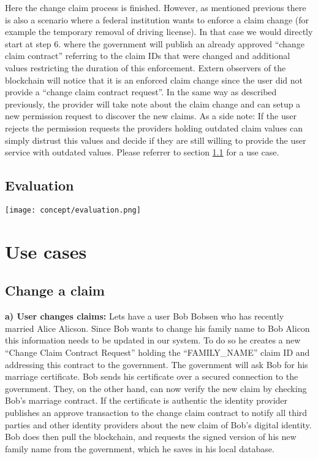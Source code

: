 Here the change claim process is finished. However, as mentioned previous there is also a scenario where a federal institution wants to enforce a claim change (for example the temporary removal of driving license). In that case we would directly start at step 6. where the government will publish an already approved “change claim contract” referring to the claim IDs that were changed and additional values restricting the duration of this enforcement. Extern observers of the blockchain will notice that it is an enforced claim change since the user did not provide a “change claim contract request”. In the same way as described previously, the provider will take note about the claim change and can setup a new permission request to discover the new claims. As a side note: If the user rejects the permission requests the providers holding outdated claim values can simply distrust this values and decide if they are still  willing to provide the user service with outdated values. Please referrer to section \ref{sec:changeClaimUseCase} for a use case.

\subsection{Evaluation}

 \texttt{[image: concept/evaluation.png]}
 
\section{Use cases}

\subsection{Change a claim}
\label{sec:changeClaimUseCase}
\textbf{a) User changes claims:}
Lets have a user Bob Bobsen who has recently married Alice Alicson. Since Bob wants to change his family name to Bob Alicon this information needs to be updated in our system. To do so he creates a new “Change Claim Contract Request” holding the “FAMILY\_NAME” claim ID and addressing this contract to the government. The government will ask Bob for his marriage certificate. Bob sends his certificate over a secured connection to the government. They, on the other hand, can now verify the new claim by checking Bob's marriage contract. If the certificate is authentic the identity provider publishes an approve transaction to the change claim contract to notify all third parties and other identity providers about the new claim of Bob's digital identity.
Bob does then pull the blockchain, and requests the signed version of his new family name from the government, which he saves in his local database.

